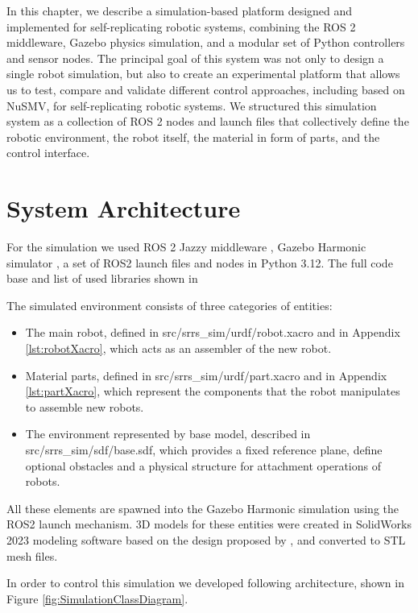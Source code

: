 In this chapter, we describe  a simulation-based platform 
designed and implemented for self-replicating robotic systems, 
combining the ROS 2  middleware, Gazebo physics simulation, 
and a modular set of Python controllers and sensor nodes. 
The principal goal of this system was not only to design a single robot simulation, 
but also to create an experimental platform that allows us to test, 
compare and validate different control approaches, including  based  on NuSMV, 
for  self-replicating robotic systems.
We structured this simulation system as a collection of ROS 2 nodes and launch 
files that collectively define the robotic environment, the robot itself, 
the material in form of parts, and the control interface. 


\section{System Architecture}

For the simulation we used ROS 2 Jazzy middleware \cite{ROS2Jazzy},  
Gazebo Harmonic simulator \cite{GazeboHarmonic}, 
a set of ROS2 launch files and nodes in Python 3.12. 
The full code base and list of used libraries shown in \cite{GitHub}

The simulated environment consists of three categories of entities:
\begin{itemize}
    \item The main robot, defined in src/srrs\_sim/urdf/robot.xacro and in Appendix \ref{lst:robotXacro}, 
        which acts as an assembler of the new robot.
    \item Material parts, defined in src/srrs\_sim/urdf/part.xacro and in Appendix \ref{lst:partXacro}, which represent the components that 
    the robot manipulates to assemble new robots.
    \item The environment represented by base model, described in src/srrs\_sim/sdf/base.sdf, which provides a 
        fixed reference plane, define optional obstacles and a physical structure for attachment 
        operations of robots.
\end{itemize}

All these elements are spawned into the Gazebo Harmonic simulation using the 
ROS2 launch mechanism.
3D models for these entities were created in SolidWorks 2023 modeling software
based on the design proposed by \cite{Jenett2019MaterialRobot}, 
and converted to STL mesh files.


In order to control this simulation we developed following architecture, 
shown in Figure \ref{fig:SimulationClassDiagram}.

